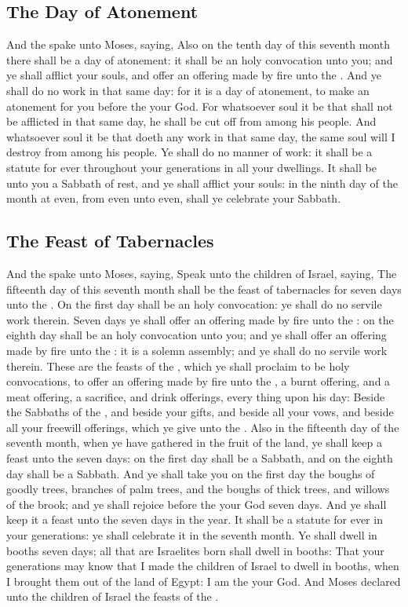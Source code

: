 \begin{biblechapter}
\subsection*{The Day of Atonement}
\verse And the \LORD spake unto Moses, saying,
\verse Also on the tenth day of this seventh month there shall be a day of atonement: it shall be an holy convocation unto you; and ye shall afflict your souls, and offer an offering made by fire unto the \LORD.
\verse And ye shall do no work in that same day: for it is a day of atonement, to make an atonement for you before the \LORD your God.
\verse For whatsoever soul it be that shall not be afflicted in that same day, he shall be cut off from among his people.
\verse And whatsoever soul it be that doeth any work in that same day, the same soul will I destroy from among his people.
\verse Ye shall do no manner of work: it shall be a statute for ever throughout your generations in all your dwellings.
\verse It shall be unto you a Sabbath of rest, and ye shall afflict your souls: in the ninth day of the month at even, from even unto even, shall ye celebrate your Sabbath.
\subsection*{The Feast of Tabernacles}
\verse And the \LORD spake unto Moses, saying,
\verse Speak unto the children of Israel, saying, The fifteenth day of this seventh month shall be the feast of tabernacles for seven days unto the \LORD.
\verse On the first day shall be an holy convocation: ye shall do no servile work therein.
\verse Seven days ye shall offer an offering made by fire unto the \LORD: on the eighth day shall be an holy convocation unto you; and ye shall offer an offering made by fire unto the \LORD: it is a solemn assembly; and ye shall do no servile work therein.
\verse These are the feasts of the \LORD, which ye shall proclaim to be holy convocations, to offer an offering made by fire unto the \LORD, a burnt offering, and a meat offering, a sacrifice, and drink offerings, every thing upon his day:
\verse Beside the Sabbaths of the \LORD, and beside your gifts, and beside all your vows, and beside all your freewill offerings, which ye give unto the \LORD.
\verse Also in the fifteenth day of the seventh month, when ye have gathered in the fruit of the land, ye shall keep a feast unto the \LORD seven days: on the first day shall be a Sabbath, and on the eighth day shall be a Sabbath.
\verse And ye shall take you on the first day the boughs of goodly trees, branches of palm trees, and the boughs of thick trees, and willows of the brook; and ye shall rejoice before the \LORD your God seven days.
\verse And ye shall keep it a feast unto the \LORD seven days in the year. It shall be a statute for ever in your generations: ye shall celebrate it in the seventh month.
\verse Ye shall dwell in booths seven days; all that are Israelites born shall dwell in booths:
\verse That your generations may know that I made the children of Israel to dwell in booths, when I brought them out of the land of Egypt: I am the \LORD your God.
\verse And Moses declared unto the children of Israel the feasts of the \LORD.
\end{biblechapter}

